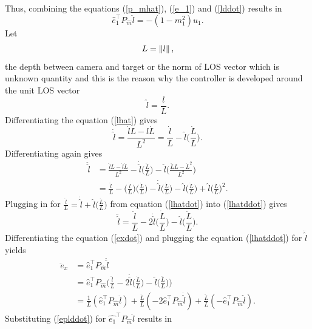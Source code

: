 Thus, combining the equations (\ref{p_mhat}), (\ref{e_1}) and (\ref{lddot})
results in 
\begin{equation}
\hat{e}_1^{\top}P_{\hat{m}}\ddot{l}=-(1-m_1^2)u_1.
\label{eplddot}
\end{equation}
Let
\begin{equation}
L=\left\lVert l\right\rVert,
\end{equation} the depth between camera and target or the norm of LOS vector which is unknown quantity and this is the reason why the controller is developed around the unit LOS vector 
\begin{equation}
\hat{l}=\frac{l}{L}.
\label{lhat}
\end{equation}
Differentiating the equation (\ref{lhat}) gives
\begin{equation}
\dot{\hat{l}}=\frac{\dot{l}L-l\dot{L}}{L^2}=\frac{\dot{l}}{L}-\hat{l}\bigg(\frac{\dot{L}}{L}\bigg).
\label{lhatdot}
\end{equation}
Differentiating again gives
\begin{align}
\ddot{\hat{l}}&=\frac{\ddot{l}L-\dot{l}\dot{L}}{L^2}-\dot{\hat{l}}\bigg(\frac{\dot{L}}{L}\bigg)-\hat{l}\bigg(\frac{\ddot{L}L-\dot{L}^2}{L^2}\bigg)
\\&=\frac{\ddot{l}}{L}-\bigg(\frac{\dot{l}}{L}\bigg)\bigg(\frac{\dot{L}}{L}\bigg)-\dot{\hat{l}}\bigg(\frac{\dot{L}}{L}\bigg)-\hat{l}\bigg(\frac{\ddot{L}}{L}\bigg)+\hat{l}\bigg(\frac{\dot{L}}{L}\bigg)^2.
\label{lhatddot}
\end{align}
Plugging in for $\frac{\dot{l}}{L}=\dot{\hat{l}}+\hat{l}\bigg(\frac{\dot{L}}{L}\bigg)$ from equation (\ref{lhatdot}) into (\ref{lhatddot}) gives
\begin{equation}
\ddot{\hat{l}}=\frac{\ddot{l}}{L}-2\dot{\hat{l}}\bigg(\frac{\dot{L}}{L}\bigg)-\hat{l}\bigg(\frac{\ddot{L}}{L}\bigg).
\label{lhatddot}
\end{equation}
Differentiating the equation (\ref{exdot}) and plugging the equation (\ref{lhatddot}) for $\ddot{\hat{l}}$ yields
\begin{align}
\ddot{e}_x&=\hat{e}_1^{\top}P_{\hat{m}}\ddot{\hat{l}}
\\&=\hat{e}_1^{\top}P_{\hat{m}}\bigg(\frac{\ddot{l}}{L}-2\dot{\hat{l}}\bigg(\frac{\dot{L}}{L}\bigg)-\hat{l}\bigg(\frac{\ddot{L}}{L}\bigg)\bigg)
\\&=\frac{1}{L}(\hat{e}_1^{\top}P_{\hat{m}}\ddot{l})+\frac{\dot{L}}{L}(-2\hat{e}_1^{\top}P_{\hat{m}}\dot{\hat{l}})+\frac{\ddot{L}}{L}(-\hat{e}_1^{\top}P_{\hat{m}}\hat{l}).
\end{align}
Substituting (\ref{eplddot}) for $\hat{e_1}^{\top}P_{\hat{m}}\ddot{l}$ results in  
